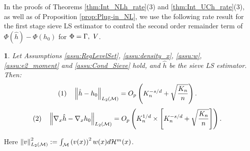 \documentclass[12pt,american]{article}
\newcommand{\cH}{\mathcal{H}}
\theoremstyle{definition}
\theoremstyle{plain}
\theoremstyle{definition}
\theoremstyle{plain}
\newtheorem{lem}{\protect\lemmaname}
\theoremstyle{plain}
\theoremstyle{plain}
\theoremstyle{plain}
\theoremstyle{plain}
\newcommand{\norm}[1]{\left\| #1 \right\|}
\providecommand{\lemmaname}{Lemma}
\providecommand{\lemmaname}{Lemma}
\begin{document}
In the proofs of Theorems \ref{thm:Int_NLh_rate}(3) and \ref{thm:Int_UCh_rate}(3), as well as of Proposition \ref{prop:Plug-in_NL}, we use the following rate result for the first stage sieve LS estimator to control the second order remainder term of $\Phi(\hat{h})-\Phi(h_0)$ for $\Phi=\Gamma,~V$.

\begin{lem}\label{lem:MSE_on_M}
Let Assumptions \ref{assu:RegLevelSet}, \ref{assu:density_x}, \ref{assu:w}, \ref{assu:e2_moment} and \ref{assu:Cond_Sieve} hold, and $\hat{h}$ be the sieve LS estimator. Then:
\[
(1)~~~\norm{\hat{h}-h_0}_{L_2(\cM)}=O_p \left(K_n^{-s/d} +\sqrt{ \frac{K_n}{n}} \right).
\]
\[
(2)~~~\norm{\Dif_x\hat{h}-\Dif_xh_0}_{L_2(\cM)}=O_p \left(K_n^{1/d}\times\left[K_n^{-s/d} +\sqrt{ \frac{K_n}{n}} \right]\right).
\]
\end{lem}
 Here $\norm{v}_{L_2(\cM)}^2 := \int_\cM \left(v(x)\right)^2w(x)d\cH^m(x)$.
\end{document}

